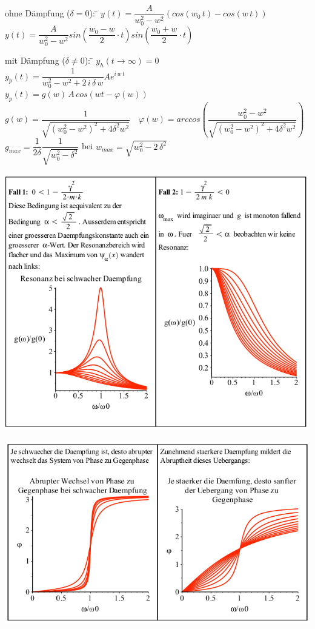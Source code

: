 \begin{tabbing}
ohne Dämpfung ($\delta = 0$): \= $y(t) = \dfrac{A}{w_0^2-w^2}(cos(w_0\,t)-cos(w\,t))$\\
\> $y(t) = \dfrac{A}{w_0^2-w^2}sin(\dfrac{w_0-w}{2} \cdot t)sin(\dfrac{w_0+w}{2} \cdot t)$\\
\end{tabbing}

\begin{tabbing}
mit Dämpfung ($\delta \neq 0$): \= $y_h(t \rightarrow \infty) = 0$\\
\> $y_p(t)= \dfrac{1}{w_0^2-w^2 + 2\,i\,\delta\,w}Ae^{i\,w\,t}$\\
\> $y_p(t)= g(w)\,A\,cos(wt-\varphi(w))$\\
\> $g(w)=\dfrac{1}{\sqrt{(w_0^2-w^2)^2+4\delta^2w^2}} \quad \varphi(w)=arccos(\dfrac{w_0^2-w^2}{\sqrt{(w_0^2-w^2)^2+4\delta^2w^2}})$\\
\> $g_{max}=\dfrac{1}{2\delta} \dfrac{1}{\sqrt{w_0^2-\delta^2}}$ bei $w_{max}=\sqrt{w_0^2-2\,\delta^2}$
\end{tabbing}
\begin{minipage}[h]{0.5\textwidth} 
	\includegraphics[width=1.0\textwidth]{images/Erzwungen1.png}
\end{minipage}
\begin{minipage}[h]{0.5\textwidth}
	\includegraphics[width=1.0\textwidth]{images/Erzwungen2.png}
\end{minipage}